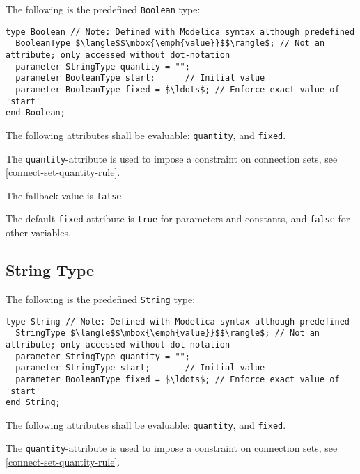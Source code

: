The following is the predefined \lstinline!Boolean! type:
\begin{lstlisting}[language=modelica]
type Boolean // Note: Defined with Modelica syntax although predefined
  BooleanType $\langle$$\mbox{\emph{value}}$$\rangle$; // Not an attribute; only accessed without dot-notation
  parameter StringType quantity = "";
  parameter BooleanType start;      // Initial value
  parameter BooleanType fixed = $\ldots$; // Enforce exact value of 'start'
end Boolean;
\end{lstlisting}%
%
%
%

The following attributes shall be evaluable: \lstinline!quantity!, and \lstinline!fixed!.

The \lstinline!quantity!-attribute is used to impose a constraint on connection sets, see \cref{connect-set-quantity-rule}.

The fallback value is \lstinline!false!.

The default \lstinline!fixed!-attribute is \lstinline!true! for parameters and constants, and \lstinline!false! for other variables.

\subsection{String Type}\label{string-type}

The following is the predefined \lstinline!String! type:
\begin{lstlisting}[language=modelica]
type String // Note: Defined with Modelica syntax although predefined
  StringType $\langle$$\mbox{\emph{value}}$$\rangle$; // Not an attribute; only accessed without dot-notation
  parameter StringType quantity = "";
  parameter StringType start;       // Initial value
  parameter BooleanType fixed = $\ldots$; // Enforce exact value of 'start'
end String;
\end{lstlisting}%
%
%

The following attributes shall be evaluable: \lstinline!quantity!, and \lstinline!fixed!.

The \lstinline!quantity!-attribute is used to impose a constraint on connection sets, see \cref{connect-set-quantity-rule}.

